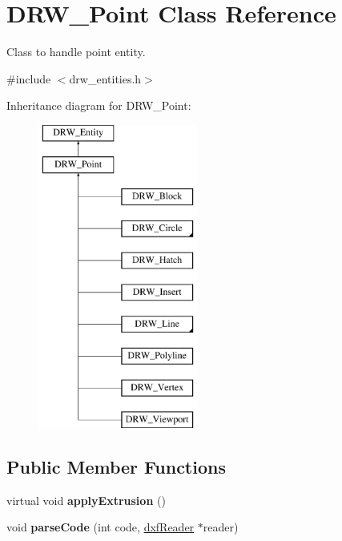 \hypertarget{classDRW__Point}{\section{D\-R\-W\-\_\-\-Point Class Reference}
\label{classDRW__Point}
}


Class to handle point entity.  




{\ttfamily \#include $<$drw\-\_\-entities.\-h$>$}

Inheritance diagram for D\-R\-W\-\_\-\-Point\-:\begin{figure}[H]
\begin{center}
\leavevmode
\includegraphics[height=10.000000cm]{classDRW__Point}
\end{center}
\end{figure}
\subsection*{Public Member Functions}
\begin{DoxyCompactItemize}
\item 
\hypertarget{classDRW__Point_a6922b7e506b81509fc4369e5e89301a4}{virtual void {\bfseries apply\-Extrusion} ()}\label{classDRW__Point_a6922b7e506b81509fc4369e5e89301a4}

\item 
\hypertarget{classDRW__Point_aafe53e3c2a9453d52652d849a7390c9f}{void {\bfseries parse\-Code} (int code, \hyperlink{classdxfReader}{dxf\-Reader} $\ast$reader)}\label{classDRW__Point_aafe53e3c2a9453d52652d849a7390c9f}

\end{DoxyCompactItemize}
